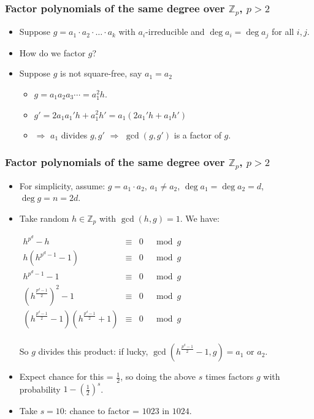 \begin{frame}
\frametitle{Factor polynomials of the same degree over $\mathbb Z_p$, $p>2$}
\begin{itemize}
\item Suppose $ g=a_1\cdot a_2\cdot \dots \cdot a_k$ with $a_i$-irreducible and $\deg a_i=\deg a_j$ for all $i,j$.
\item How do we factor $g$?
\item Suppose $g$ is not square-free, say $a_1=a_2$
\begin{itemize}
\item $g= a_1a_2 a_3\cdots= a_1^2  h$.
\item $g'= 2a_1 a_1' h+ a_1^2 h'=a_1(2a_1'h+a_1h')$ 
\item $\Rightarrow$ $a_1$ divides $g, g' $ $\Rightarrow$ $\gcd(g,g')$ is a factor of $g$.
\end{itemize} 
\end{itemize}
\end{frame}

\begin{frame}
\frametitle{Factor polynomials of the same degree over $\mathbb Z_p$, $p>2$}
\begin{itemize}
\item For simplicity, assume: $g=a_1\cdot a_2$, $a_1\neq a_2$, $\deg a_1=\deg a_2=d$, $\deg g=n=2d$. 
\item  Take random $h\in \mathbb Z_p$ with $\gcd(h,g)=1$. We have:

\hfil \hfil $
\begin{array}{rcll}
h^{p^d}-h &\equiv &0&\mod g\\
h\left(h^{p^d-1}-1 \right)& \equiv &0&\mod g \\
h^{p^d-1}-1&\equiv&0&\mod g\\
\left( h^{\frac{p^d-1}{2}}\right)^2 - 1&\equiv&0& \mod g\\
\left( h^{\frac{p^d-1}{2}} - 1\right)\left( h^{\frac{p^d-1}{2}}+ 1\right) &\equiv&0& \mod g\\
\end{array}
$

So $g$ divides this product: if lucky, $\gcd\left(h^{\frac{p^d-1}{2}} - 1,g\right)=a_1$ or $a_2$.

\item Expect chance for this = $\frac{1}{2}$, so doing the above $s$ times factors $g$ with probability $1-\left(\frac{1}{2} \right)^s$. 
\item Take $s=10$: chance to factor = $1023$ in $1024$.
\end{itemize}
\end{frame}